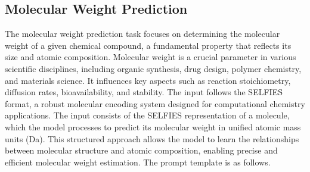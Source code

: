 \subsection{Molecular Weight Prediction}
The molecular weight prediction task focuses on determining the molecular weight of a given chemical compound, a fundamental property that reflects its size and atomic composition. Molecular weight is a crucial parameter in various scientific disciplines, including organic synthesis, drug design, polymer chemistry, and materials science. It influences key aspects such as reaction stoichiometry, diffusion rates, bioavailability, and stability. The input follows the SELFIES format, a robust molecular encoding system designed for computational chemistry applications. The input consists of the SELFIES representation of a molecule, which the model processes to predict its molecular weight in unified atomic mass units (Da). This structured approach allows the model to learn the relationships between molecular structure and atomic composition, enabling precise and efficient molecular weight estimation. The prompt template is as follows.

